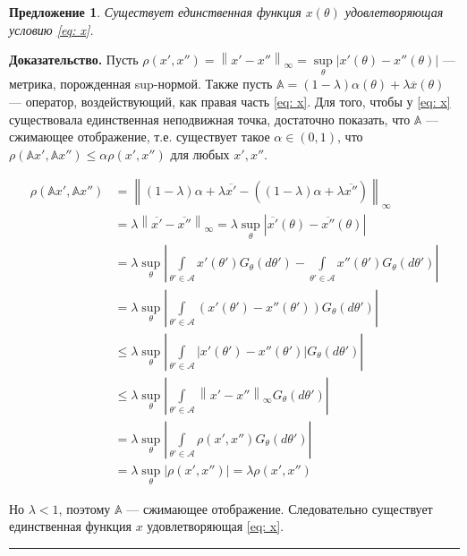 \documentclass[12pt]{article}
\newtheorem{proposition}{Предложение}
\newenvironment{proof}[1][Доказательство]{\noindent\textbf{#1.} }{\ \rule{0.5em}{0.5em}}
\newcommand\norm[1]{\left\lVert#1\right\rVert}
\newcommand\abs[1]{\left\lvert#1\right\rvert}
\begin{document}
\begin{proposition}
Существует единственная функция $x(\theta)$ удовлетворяющая условию \eqref{eq: x}.
\end{proposition}
\begin{proof}
Пусть $\rho(x', x'') = \norm{x' - x''}_\infty = \sup\limits_\theta \abs{x'(\theta) - x''(\theta)}$ --- метрика,  порожденная sup-нормой. Также пусть $\mathbb{A} = (1-\lambda)\alpha(\theta) + \lambda \overline{x}(\theta)$ --- оператор,  воздействующий, как правая часть \eqref{eq: x}.  Для того,  чтобы у \eqref{eq: x} существовала единственная неподвижная точка,  достаточно показать, что $\mathbb{A}$ --- сжимающее отображение,  т.е.  существует такое $\alpha \in (0, 1)$, что $\rho(\mathbb{A}x',\mathbb{A}x'') \leqslant \alpha \rho(x', x'')$ для любых $x', x''$.

\begin{align*}
\rho(\mathbb{A}x',\mathbb{A}x'') &= \norm{(1-\lambda)\alpha + \lambda \overline{x'} - ((1-\lambda)\alpha + \lambda \overline{x''})}_\infty \\
&= \lambda \norm{\overline{x'} - \overline{x''}}_\infty 
= \lambda \sup\limits_\theta \abs{\overline{x'}(\theta) - \overline{x''}(\theta)} \\
&= \lambda \sup\limits_\theta \abs{\int\limits_{\theta' \in \mathcal{A}} x'(\theta') G_\theta(d \theta') - \int\limits_{\theta' \in \mathcal{A}} x''(\theta') G_\theta(d \theta')} \\
&= \lambda \sup\limits_\theta \abs{\int\limits_{\theta' \in \mathcal{A}} (x'(\theta') - x''(\theta')) G_\theta(d \theta')} \\
&\leq \lambda \sup\limits_\theta \abs{\int\limits_{\theta' \in \mathcal{A}} \abs{x'(\theta') - x''(\theta')} G_\theta(d \theta')} \\
&\leq \lambda \sup\limits_\theta \abs{\int\limits_{\theta' \in \mathcal{A}} \norm{x' - x''}_\infty G_\theta(d \theta')} \\
&= \lambda \sup\limits_\theta \abs{\int\limits_{\theta' \in \mathcal{A}} \rho(x', x'') G_\theta(d \theta')} \\
&= \lambda \sup\limits_\theta \abs{\rho(x', x'')} = \lambda \rho(x', x'')
\end{align*}

Но $\lambda < 1$,  поэтому $\mathbb{A}$ --- сжимающее отображение.  Следовательно существует единственная функция $x$ удовлетворяющая \eqref{eq: x}.
\end{proof}
\end{document}

